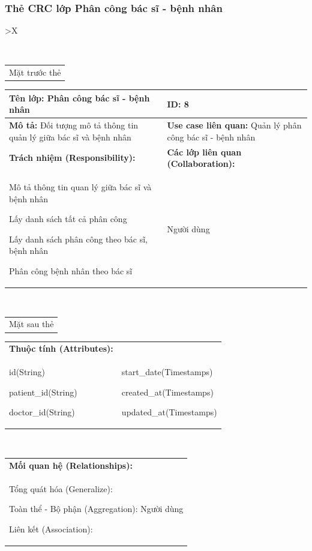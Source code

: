 \subsubsection{Thẻ CRC lớp Phân công bác sĩ - bệnh nhân}
  \begin{xltabular}{\textwidth}{
    >{\centering\arraybackslash}X 
  }
  \caption{\bfseries \fontsize{12pt}{0pt}\selectfont Thẻ CRC lớp Phân công bác sĩ - bệnh nhân}
  \\
  \begin{tabularx}{0.9\textwidth}{X}
    Mặt trước thẻ
  \end{tabularx}
  \begin{tabularx}{0.9\textwidth}{|X|X|}
    \hline
    \textbf{Tên lớp:} Phân công bác sĩ - bệnh nhân & \textbf{ID:} 8 \\
    \hline
    \textbf{Mô tả:} Đối tượng mô tả thông tin quản lý giữa bác sĩ và bệnh nhân & \textbf{Use case liên quan:} Quản lý phân công bác sĩ - bệnh nhân \\
    \hline
    \textbf{Trách nhiệm (Responsibility):} & \textbf{Các lớp liên quan (Collaboration):} \\
    Mô tả thông tin quan lý giữa bác sĩ và bệnh nhân

    Lấy danh sách tất cả phân công

    Lấy danh sách phân công theo bác sĩ, bệnh nhân

    Phân công bệnh nhân theo bác sĩ
    & 
    Người dùng
    \\
    \hline
  \end{tabularx}
  \\ 
  \begin{tabularx}{0.9\textwidth}{X}
    Mặt sau thẻ
  \end{tabularx} 
  \begin{tabularx}{0.9\textwidth}{|X|X|}
    \hline
    \textbf{Thuộc tính (Attributes):} & \\
    id(String) 
    
    patient\_id(String)

    doctor\_id(String)
    & 
    start\_date(Timestamps) 
          
    created\_at(Timestamps)

    updated\_at(Timestamps)
    \\
    \hline
  \end{tabularx}
  \\     
  \begin{tabularx}{0.9\textwidth}{|X|}
    \textbf{Mối quan hệ (Relationships):} \\
    Tổng quát hóa (Generalize):

    Toàn thể - Bộ phận (Aggregation): Người dùng
    
    Liên kết (Association):  
    \\
    \hline
  \end{tabularx}
  \end{xltabular}

